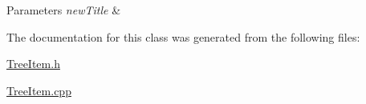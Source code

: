 \begin{DoxyParams}{Parameters}
{\em new\-Title} & \\
\hline
\end{DoxyParams}


The documentation for this class was generated from the following files\-:\begin{DoxyCompactItemize}
\item 
\hyperlink{_tree_item_8h}{Tree\-Item.\-h}\item 
\hyperlink{_tree_item_8cpp}{Tree\-Item.\-cpp}\end{DoxyCompactItemize}
